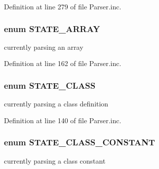 \-Definition at line 279 of file \-Parser.\-inc.

\hypertarget{_parser_8inc_a4523af23d05c20ad5f2e8a3752bab5e3}{
\subsubsection[{\-S\-T\-A\-T\-E\-\_\-\-A\-R\-R\-A\-Y}]{\setlength{\rightskip}{0pt plus 5cm}enum {\bf \-S\-T\-A\-T\-E\-\_\-\-A\-R\-R\-A\-Y}}}\label{_parser_8inc_a4523af23d05c20ad5f2e8a3752bab5e3}
currently parsing an array 

\-Definition at line 162 of file \-Parser.\-inc.

\hypertarget{_parser_8inc_a6c11979376724f4ef3dde528af04cb05}{
\subsubsection[{\-S\-T\-A\-T\-E\-\_\-\-C\-L\-A\-S\-S}]{\setlength{\rightskip}{0pt plus 5cm}enum {\bf \-S\-T\-A\-T\-E\-\_\-\-C\-L\-A\-S\-S}}}\label{_parser_8inc_a6c11979376724f4ef3dde528af04cb05}
currently parsing a class definition 

\-Definition at line 140 of file \-Parser.\-inc.

\hypertarget{_parser_8inc_a7f94140e1e20a079694673e5ef97622d}{
\subsubsection[{\-S\-T\-A\-T\-E\-\_\-\-C\-L\-A\-S\-S\-\_\-\-C\-O\-N\-S\-T\-A\-N\-T}]{\setlength{\rightskip}{0pt plus 5cm}enum {\bf \-S\-T\-A\-T\-E\-\_\-\-C\-L\-A\-S\-S\-\_\-\-C\-O\-N\-S\-T\-A\-N\-T}}}\label{_parser_8inc_a7f94140e1e20a079694673e5ef97622d}
currently parsing a class constant 

